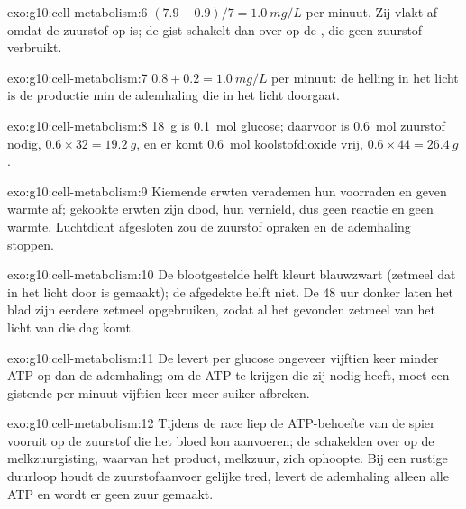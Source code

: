 \begin{solution}{exo:g10:cell-metabolism:6}
$(7.9 - 0.9)/7 = \qty{1.0}{mg/L}$ per minuut. Zij vlakt af omdat de
zuurstof op is; de gist schakelt dan over op de , die geen
zuurstof verbruikt.
\end{solution}

\begin{solution}{exo:g10:cell-metabolism:7}
$0.8 + 0.2 = \qty{1.0}{mg/L}$ per minuut: de helling in het licht is de
productie min de ademhaling die in het licht doorgaat.
\end{solution}

\begin{solution}{exo:g10:cell-metabolism:8}
\qty{18}{g} is \qty{0.1}{mol} glucose; daarvoor is \qty{0.6}{mol}
zuurstof nodig, $0.6 \times 32 = \qty{19.2}{g}$, en er komt
\qty{0.6}{mol} koolstofdioxide vrij, $0.6 \times 44 = \qty{26.4}{g}$.
\end{solution}

\begin{solution}{exo:g10:cell-metabolism:9}
Kiemende erwten verademen hun voorraden en geven warmte af; gekookte
erwten zijn dood, hun  vernield, dus geen reactie en geen warmte.
Luchtdicht afgesloten zou de zuurstof opraken en de ademhaling stoppen.
\end{solution}

\begin{solution}{exo:g10:cell-metabolism:10}
De blootgestelde helft kleurt blauwzwart (zetmeel dat in het licht door
 is gemaakt); de afgedekte helft niet. De 48 uur donker
laten het blad zijn eerdere zetmeel opgebruiken, zodat al het gevonden
zetmeel van het licht van die dag komt.
\end{solution}

\begin{solution}{exo:g10:cell-metabolism:11}
De  levert per glucose ongeveer vijftien keer minder ATP op dan
de ademhaling; om de ATP te krijgen die zij nodig heeft, moet een
gistende  per minuut vijftien keer meer suiker afbreken.
\end{solution}

\begin{solution}{exo:g10:cell-metabolism:12}
Tijdens de race liep de ATP-behoefte van de spier vooruit op de zuurstof
die het bloed kon aanvoeren; de  schakelden over op de
melkzuurgisting, waarvan het product, melkzuur, zich ophoopte. Bij een
rustige duurloop houdt de zuurstofaanvoer gelijke tred, levert de
ademhaling alleen alle ATP en wordt er geen zuur gemaakt.
\end{solution}

